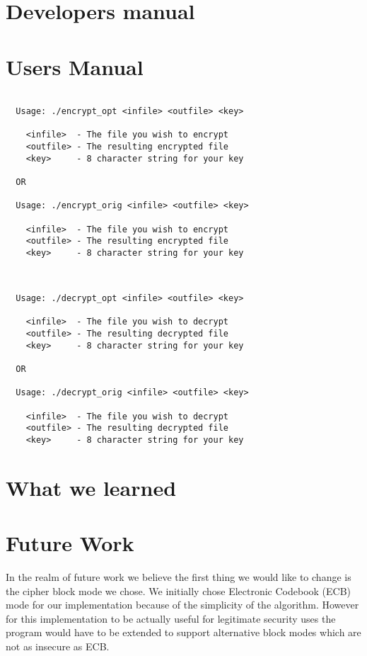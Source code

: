 \documentclass[12pt]{article}
\begin{document}
\section{Developers manual}
\section{Users Manual}

\begin{verbatim}

  Usage: ./encrypt_opt <infile> <outfile> <key>

    <infile>  - The file you wish to encrypt
    <outfile> - The resulting encrypted file
    <key>     - 8 character string for your key

  OR

  Usage: ./encrypt_orig <infile> <outfile> <key>

    <infile>  - The file you wish to encrypt
    <outfile> - The resulting encrypted file
    <key>     - 8 character string for your key


\end{verbatim}

\begin{verbatim}

  Usage: ./decrypt_opt <infile> <outfile> <key>

    <infile>  - The file you wish to decrypt
    <outfile> - The resulting decrypted file
    <key>     - 8 character string for your key

  OR

  Usage: ./decrypt_orig <infile> <outfile> <key>

    <infile>  - The file you wish to decrypt
    <outfile> - The resulting decrypted file
    <key>     - 8 character string for your key

\end{verbatim}

\section{What we learned}

\section{Future Work}

  In the realm of future work we believe the first thing we would like to change is the cipher block mode we chose.
  We initially chose Electronic Codebook (ECB) mode for our implementation because of the simplicity of the algorithm.
  However for this implementation to be actually useful for legitimate security uses the program would have to be extended
  to support alternative block modes which are not as insecure as ECB.
\end{document}
